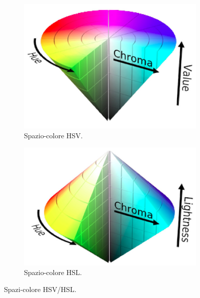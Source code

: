\documentclass{subfiles}
\begin{document}
\begin{figure}[!h]
    \centering
    \begin{subfigure}[b]{0.35\textwidth}
        \centering
        \includegraphics[scale = 0.175]{../Images/Spazio HSV.jpg}
        \caption{Spazio-colore HSV.}
    \end{subfigure}
    \hspace{10pt}
    \begin{subfigure}[b]{0.35\textwidth}
        \centering
        \includegraphics[scale = 0.175]{../Images/Spazio HSL.jpg}
        \caption{Spazio-colore HSL.}
    \end{subfigure}
    \caption{Spazi-colore HSV/HSL.}
    \label{fig:3.1}
\end{figure}
\end{document}
